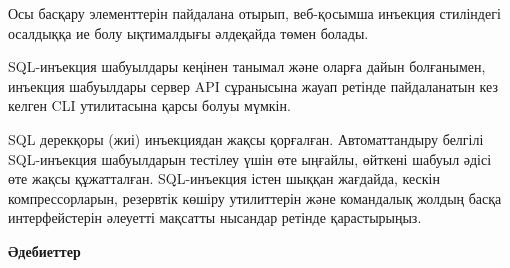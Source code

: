 \begin{multicols}{2}
Осы басқару элементтерін пайдалана отырып, веб-қосымша инъекция
стиліндегі осалдыққа ие болу ықтималдығы әлдеқайда төмен болады.

SQL-инъекция шабуылдары кеңінен танымал және оларға дайын болғанымен,
инъекция шабуылдары сервер API сұранысына жауап ретінде пайдаланатын кез
келген CLI утилитасына қарсы болуы мүмкін.

SQL дерекқоры (жиі) инъекциядан жақсы қорғалған. Автоматтандыру белгілі
SQL-инъекция шабуылдарын тестілеу үшін өте ыңғайлы, өйткені шабуыл әдісі
өте жақсы құжатталған. SQL-инъекция істен шыққан жағдайда, кескін
компрессорларын, резервтік көшіру утилиттерін және командалық жолдың
басқа интерфейстерін әлеуетті мақсатты нысандар ретінде қарастырыңыз.

\end{multicols}


\begin{center}
  {\bfseries Әдебиеттер}
\end{center}

